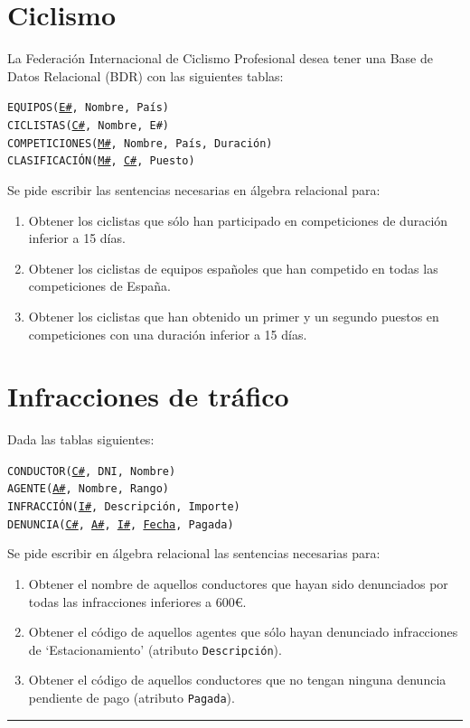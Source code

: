 \documentclass[a4paper]{article}
\begin{document}
\section{Ciclismo}

La Federación Internacional de Ciclismo Profesional desea tener una Base de Datos Relacional (BDR) con las siguientes tablas:

\begin{addmargin}[1.5em]{0em}
    \texttt{EQUIPOS(\underline{E\#}, Nombre, País)}\\
    \texttt{CICLISTAS(\underline{C\#}, Nombre, E\#)}\\
    \texttt{COMPETICIONES(\underline{M\#}, Nombre, País, Duración)}\\
    \texttt{CLASIFICACIÓN(\underline{M\#}, \underline{C\#}, Puesto)}
\end{addmargin}

Se pide escribir las sentencias necesarias en álgebra relacional para:

\begin{enumerate}
    \item Obtener los ciclistas que sólo han participado en competiciones de duración inferior a 15 días.
    \item Obtener los ciclistas de equipos españoles que han competido en todas las competiciones de España.
    \item Obtener los ciclistas que han obtenido un primer y un segundo puestos en competiciones con una duración inferior a 15 días.
\end{enumerate}

\section{Infracciones de tráfico}

Dada las tablas siguientes:

\begin{addmargin}[1.5em]{0em}
    \texttt{CONDUCTOR(\underline{C\#}, DNI, Nombre)}\\
    \texttt{AGENTE(\underline{A\#}, Nombre, Rango)}\\
    \texttt{INFRACCIÓN(\underline{I\#}, Descripción, Importe)}\\
    \texttt{DENUNCIA(\underline{C\#}, \underline{A\#}, \underline{I\#}, \underline{Fecha}, Pagada)}
\end{addmargin}

Se pide escribir en álgebra relacional las sentencias necesarias para:

\begin{enumerate}
    \item Obtener el nombre de aquellos conductores que hayan sido denunciados por todas las infracciones inferiores a 600€.
    \item Obtener el código de aquellos agentes que sólo hayan denunciado infracciones de `Estacionamiento' (atributo \texttt{Descripción}).
    \item Obtener el código de aquellos conductores que no tengan ninguna denuncia pendiente de pago (atributo \texttt{Pagada}).
\end{enumerate}

\vspace{1em}
\hrule
\doclicenseThis
\end{document}
